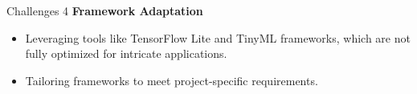 \begin{frame}{Challenges 4}
\textbf{Framework Adaptation}

	\begin{itemize}
	
		\item Leveraging tools like TensorFlow Lite and TinyML frameworks, which are not fully optimized for intricate applications.
	
		\item Tailoring frameworks to meet project-specific requirements.
\end{itemize}

\end{frame}
